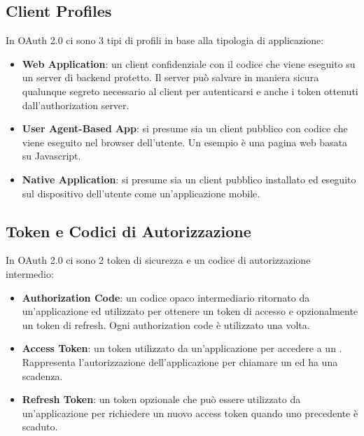 \subsection{Client Profiles}

In OAuth 2.0 ci sono 3 tipi di profili in base alla tipologia di applicazione:

\begin{itemize}
      \item \textbf{Web Application}: un client confidenziale con il codice che viene
            eseguito su un server di backend protetto. Il server può salvare in maniera
            sicura qualunque segreto necessario al client per autenticarsi e anche i
            token ottenuti dall'authorization server.
      \item \textbf{User Agent-Based App}: si presume sia un client pubblico con codice
            che viene eseguito nel browser dell'utente. Un esempio è una pagina web
            basata su Javascript.
      \item \textbf{Native Application}: si presume sia un client pubblico installato
            ed eseguito sul dispositivo dell'utente come un'applicazione mobile.
\end{itemize}

\subsection{Token e Codici di Autorizzazione}

In OAuth 2.0 ci sono 2 token di sicurezza e un codice di autorizzazione intermedio:

\begin{itemize}
      \item \textbf{Authorization Code}: un codice opaco intermediario ritornato
            da un'applicazione ed utilizzato per ottenere un token di accesso e
            opzionalmente un token di refresh. Ogni authorization code è utilizzato
            una volta.
      \item \textbf{Access Token}: un token utilizzato da un'applicazione per accedere
            a un \api{}. Rappresenta l'autorizzazione dell'applicazione per chiamare un \api{}
            ed ha una scadenza.
      \item \textbf{Refresh Token}: un token opzionale che può essere utilizzato da
            un'applicazione per richiedere un nuovo access token quando uno precedente
            è scaduto.
\end{itemize}

